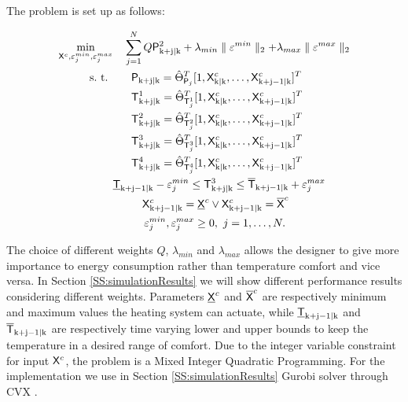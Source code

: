 The problem is set up as follows:
\begin{problem}\label{P:dpcRealCase}
\begin{align}
	\begin{aligned}
		\min_{\tX^c,\eps_j^{min},\eps_j^{max}} & \ \ \ \sum_{j=1}^{N} Q{\tP}_{\mathrm{k+j|k}}^2 +  \lambda_{min}\parallel\eps^{min}\parallel_2 + \lambda_{max}\parallel\eps^{max}\parallel_2 \\
		\text{s.~t. }& \ \ \ \ \ {\tP}_{\mathrm{k+j|k}} =  \hat{\Theta}^{T}_{\tP_j} [ 1,\tX^c_{\mathrm{k|k}},\dots,\tX^c_{\mathrm{k+j-1|k}} ]^T \\
					 & \ \ \ \ \ \tT^1_{\mathrm{k+j|k}} =  \hat{\Theta}^{T}_{\tT^1_j} [ 1,\tX^c_{\mathrm{k|k}},\dots,\tX^c_{\mathrm{k+j-1|k}} ]^T \\
					 & \ \ \ \ \ \tT^2_{\mathrm{k+j|k}} =  \hat{\Theta}^{T}_{\tT^2_j} [ 1,\tX^c_{\mathrm{k|k}},\dots,\tX^c_{\mathrm{k+j-1|k}} ]^T \\
			 	 	 & \ \ \ \ \ \tT^3_{\mathrm{k+j|k}} =  \hat{\Theta}^{T}_{\tT^3_j} [ 1,\tX^c_{\mathrm{k|k}},\dots,\tX^c_{\mathrm{k+j-1|k}} ]^T \\
				 	 & \ \ \ \ \ \tT^4_{\mathrm{k+j|k}} =  \hat{\Theta}^{T}_{\tT^4_j} [ 1,\tX^c_{\mathrm{k|k}},\dots,\tX^c_{\mathrm{k+j-1|k}} ]^T \\					
					 & \underline{\tT}_{\mathrm{k+j-1|k}}-\eps^{min}_j \leq \tT^3_{\mathrm{k+j|k}} \leq \overline{\tT}_{\mathrm{k+j-1|k}} + \eps^{max}_j\\
					 & \ \ \ \ \ \ \ \ \tX^c_{\mathrm{k+j-1|k}} = \underline{\tX}^c \lor \tX^c_{\mathrm{k+j-1|k}} = \overline{\tX}^c\\ 
					 & \ \ \ \ \ \ \ \ \,\eps^{min}_j,\eps^{max}_j \geq 0, \ j = 1,\dots,N.
	\end{aligned}
	\label{E:DPCrealcase}
\end{align}
\end{problem}
The choice of different weights $Q$, $\lambda_{min}$ and $\lambda_{max}$ allows the designer to give more importance to energy consumption rather than temperature comfort and vice versa. In Section \ref{SS:simulationResults} we will show different performance results considering different weights. Parameters $\underline{\mathsf{X}}^c$ and $\overline{\mathsf{X}}^c$ are respectively minimum and maximum values the heating system can actuate, while $\underline{\mathsf{T}}_{\mathrm{k+j-1|k}}$ and $\overline{\mathsf{T}}_{\mathrm{k+j-1|k}}$ are respectively time varying lower and upper bounds to keep the temperature in a desired range of comfort. Due to the integer variable constraint for input $\mathsf{X}^c$, the problem is a Mixed Integer Quadratic Programming. For the implementation we use in Section \ref{SS:simulationResults} Gurobi solver \cite{Gurobi2015} through CVX \cite{cvx,gb08}.

